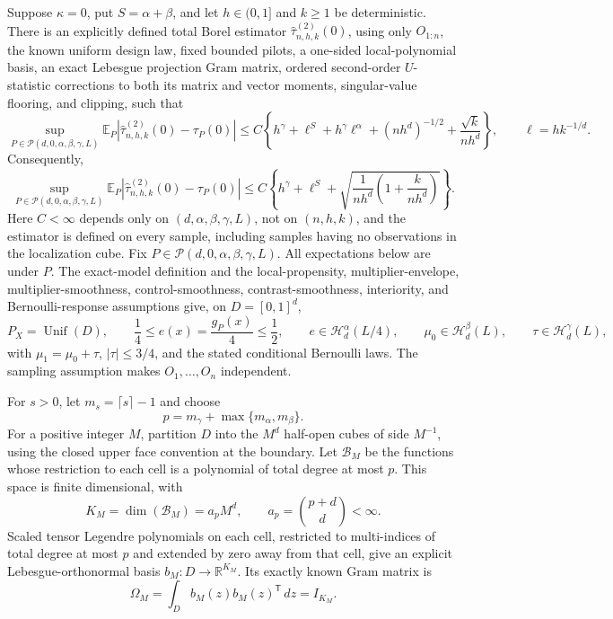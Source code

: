 Suppose \(\kappa=0\), put \(S=\alpha+\beta\), and let \(h\in(0,1]\) and \(k\geq1\) be deterministic.  There is an explicitly defined total Borel estimator \(\widehat\tau^{(2)}_{n,h,k}(0)\), using only \(O_{1:n}\), the known uniform design law, fixed bounded pilots, a one-sided local-polynomial basis, an exact Lebesgue projection Gram matrix, ordered second-order \(U\)-statistic corrections to both its matrix and vector moments, singular-value flooring, and clipping, such that
\[
 \sup_{P\in\mathcal P(d,0,\alpha,\beta,\gamma,L)}
 \mathbb E_P\left|\widehat\tau^{(2)}_{n,h,k}(0)-\tau_P(0)\right|
 \leq C\left\{
 h^\gamma+\ell^S+h^\gamma\ell^\alpha
 +(nh^d)^{-1/2}+\frac{\sqrt{k}}{nh^d}
 \right\},
 \qquad \ell=hk^{-1/d}.
\]
Consequently,
\[
 \sup_{P\in\mathcal P(d,0,\alpha,\beta,\gamma,L)}
 \mathbb E_P\left|\widehat\tau^{(2)}_{n,h,k}(0)-\tau_P(0)\right|
 \leq C\left\{
 h^\gamma+\ell^S+
 \sqrt{\frac{1}{nh^d}\left(1+\frac{k}{nh^d}\right)}
 \right\}.
\]
Here \(C<\infty\) depends only on \((d,\alpha,\beta,\gamma,L)\), not on \((n,h,k)\), and the estimator is defined on every sample, including samples having no observations in the localization cube.
Fix \(P\in\mathcal P(d,0,\alpha,\beta,\gamma,L)\).  All expectations below are under \(P\).  The exact-model definition and the local-propensity, multiplier-envelope, multiplier-smoothness, control-smoothness, contrast-smoothness, interiority, and Bernoulli-response assumptions give, on \(D=[0,1]^d\),
\[
 P_X=\operatorname{Unif}(D),\qquad
 \frac14\leq e(x)=\frac{g_P(x)}4\leq\frac12,
 \qquad e\in\mathcal H_d^\alpha(L/4),
 \qquad \mu_0\in\mathcal H_d^\beta(L),
 \qquad \tau\in\mathcal H_d^\gamma(L),
 \tag{1}
\]
with \(\mu_1=\mu_0+\tau\), \(|\tau|\leq3/4\), and the stated conditional Bernoulli laws.  The sampling assumption makes \(O_1,\ldots,O_n\) independent.

For \(s>0\), let \(m_s=\lceil s\rceil-1\) and choose
\[
 p=m_\gamma+\max\{m_\alpha,m_\beta\}.
\]
For a positive integer \(M\), partition \(D\) into the \(M^d\) half-open cubes of side \(M^{-1}\), using the closed upper face convention at the boundary.  Let \(\mathcal B_M\) be the functions whose restriction to each cell is a polynomial of total degree at most \(p\).  This space is finite dimensional, with
\[
 K_M=\dim(\mathcal B_M)=a_pM^d,
 \qquad a_p=\binom{p+d}{d}<\infty.
 \tag{2}
\]
Scaled tensor Legendre polynomials on each cell, restricted to multi-indices of total degree at most \(p\) and extended by zero away from that cell, give an explicit Lebesgue-orthonormal basis \(b_M:D\to\mathbb R^{K_M}\).  Its exactly known Gram matrix is
\[
 \Omega_M=\int_D b_M(z)b_M(z)^{\mathsf T}\,dz=I_{K_M}.
 \tag{3}
\]

